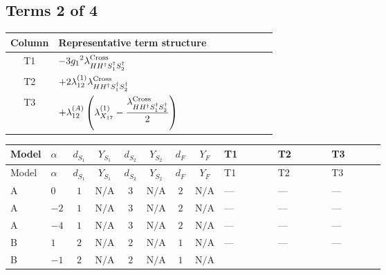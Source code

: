 \documentclass[8pt]{article}
\begin{document}
\begin{landscape}
\subsection*{Terms 2 of 4}
\begin{center}
\begin{tabular}{@{}c >{\raggedright\arraybackslash}p{0.82\linewidth}@{}}
\toprule
Column & Representative term structure \\
\midrule
T1 & \(\displaystyle -3 {g_1}^2 {\lambda_{H H^\dagger S_1^\dagger S_2^\dagger}^{\rm Cross}}\) \\
\midrule
T2 & \(\displaystyle +2 {\lambda_{12}^{(1)}} {\lambda_{H H^\dagger S_1^\dagger S_2^\dagger}^{\rm Cross}}\) \\
\midrule
T3 & \(\displaystyle +{\lambda_{12}^{(A)}} \left({\lambda_{X_{17}}^{(1)}}-\frac{{\lambda_{H H^\dagger S_1^\dagger S_2^\dagger}^{\rm Cross}}}{2}\right)\) \\
\midrule
\bottomrule
\end{tabular}
\end{center}
\smallskip
\tiny
\begin{longtable}{@{}llcccccc >{\raggedright\arraybackslash}p{0.21\linewidth} >{\raggedright\arraybackslash}p{0.21\linewidth} >{\raggedright\arraybackslash}p{0.21\linewidth}@{}}
\toprule
Model & $\alpha$ & $d_{S_1}$ & $Y_{S_1}$ & $d_{S_2}$ & $Y_{S_2}$ & $d_F$ & $Y_F$ & T1 & T2 & T3 \\
\midrule
\endfirsthead
\toprule
Model & $\alpha$ & $d_{S_1}$ & $Y_{S_1}$ & $d_{S_2}$ & $Y_{S_2}$ & $d_F$ & $Y_F$ & T1 & T2 & T3 \\
\midrule
\endhead
A & $0$ & $1$ & $\text{N/A}$ & $3$ & $\text{N/A}$ & $2$ & $\text{N/A}$ & --- & --- & --- \\
\midrule
A & $-2$ & $1$ & $\text{N/A}$ & $3$ & $\text{N/A}$ & $2$ & $\text{N/A}$ & --- & --- & --- \\
\midrule
A & $-4$ & $1$ & $\text{N/A}$ & $3$ & $\text{N/A}$ & $2$ & $\text{N/A}$ & --- & --- & --- \\
\midrule
B & $1$ & $2$ & $\text{N/A}$ & $2$ & $\text{N/A}$ & $1$ & $\text{N/A}$ & --- & --- & --- \\
\midrule
B & $-1$ & $2$ & $\text{N/A}$ & $2$ & $\text{N/A}$ & $1$ & $\text{N/A}$ & \scriptsize\adjustbox{max width=\linewidth}{$\begin{gathered} -3 {g_1}^2 {\lambda_{H H^\dagger S_1^\dagger S_2^\dagger}^{\rm Cross}}\end{gathered}$} & \scriptsize\adjustbox{max width=\linewidth}{$\begin{gathered} +2 {\lambda_{12}^{(1)}} {\lambda_{H H^\dagger S_1^\dagger S_2^\dagger}^{\rm Cross}}\end{gathered}$} & \scriptsize\adjustbox{max width=\linewidth}{$\begin{gathered} +{\lambda_{12}^{(A)}} \left({\lambda_{X_{17}}^{(1)}}-\frac{{\lambda_{H H^\dagger S_1^\dagger S_2^\dagger}^{\rm Cross}}}{2}\right)\end{gathered}$} \\

\end{longtable}
\end{landscape}
\end{document}
